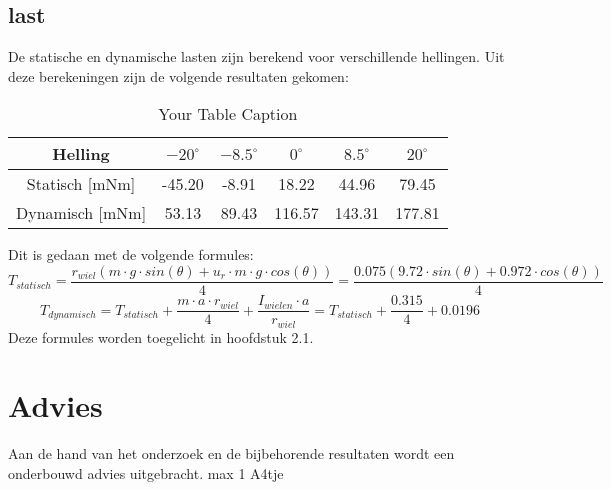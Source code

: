 \documentclass{article}
\begin{document}
    \subsection{last}
    De statische en dynamische lasten zijn berekend voor verschillende hellingen. Uit deze berekeningen zijn de volgende resultaten gekomen: 

        \begin{table}[h]
            \centering
            \begin{tabular}{|c|c|c|c|c|c|}
            \hline
            Helling & $-20 ^\circ$ & $-8.5 ^\circ$ & $0 ^\circ$ & $8.5 ^\circ$ & $20 ^\circ$ \\ \hline
            Statisch [mNm]  & -45.20   & -8.91   & 18.22   & 44.96  & 79.45   \\ \hline
            Dynamisch [mNm]  & 53.13  & 89.43   & 116.57  & 143.31  & 177.81  \\ \hline
            \end{tabular}
            \caption{Your Table Caption}
            \label{tab:your_table_label}
        \end{table}
        
        Dit is gedaan met de volgende formules:
        $$T_{statisch} = \frac{r_{wiel}(m \cdot g \cdot sin(\theta) + u_r \cdot m \cdot g \cdot cos(\theta))}{4} = \frac{0.075(9.72 \cdot sin(\theta) +  0.972 \cdot cos(\theta))}{4}$$
        $$T_{dynamisch} = T_{statisch} + \frac{m \cdot a \cdot r_{wiel}}{4} + \frac{I_{wielen} \cdot a}{r_{wiel}} = T_{statisch} + \frac{0.315}{4}+ 0.0196 $$
        Deze formules worden toegelicht in hoofdstuk 2.1.    
        
        
        


\section{Advies}
    Aan de hand van het onderzoek en de
    bijbehorende resultaten wordt een onderbouwd
    advies uitgebracht. max 1 A4tje

\appendix
\end{document}
